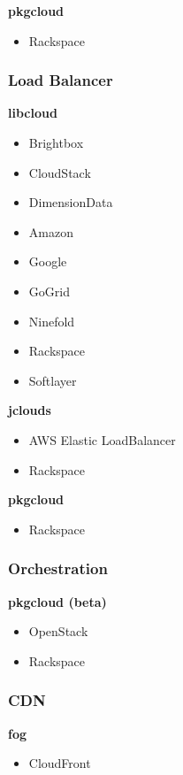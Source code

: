 \textbf{pkgcloud}
\begin{itemize}
\item Rackspace
\end{itemize}

\subsubsection{Load Balancer}
\textbf{libcloud}
\begin{multicols}{2}
\begin{itemize}
\item Brightbox
\item CloudStack
\item DimensionData
\item Amazon
\item Google
\item GoGrid
\item Ninefold
\item Rackspace
\item Softlayer
\end{itemize}
\end{multicols}


\textbf{jclouds}
\begin{multicols}{2}
\begin{itemize}
\item AWS Elastic LoadBalancer
\item Rackspace
\end{itemize}
\end{multicols}

\textbf{pkgcloud}
\begin{itemize}
\item Rackspace
\end{itemize}

\subsubsection{Orchestration}
\textbf{pkgcloud (beta)}
\begin{multicols}{2}
\begin{itemize}
\item OpenStack
\item Rackspace
\end{itemize}
\end{multicols}

\subsubsection{CDN}
\textbf{fog}
\begin{itemize}
\item CloudFront
\end{itemize}

